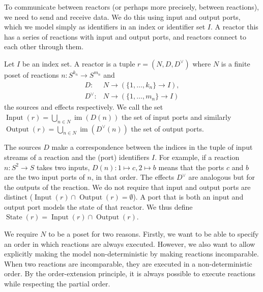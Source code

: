 To communicate between reactors (or perhaps more precisely, between reactions), we need to send and receive data.
We do this using input and output ports, which we model simply as identifiers in an index or identifier set $I$. 
A reactor this has a series of reactions with input and output ports, and reactors connect to each other through them.

\begin{defn}[Reactor]
\label{defn:reactor}
Let $I$ be an index set. A reactor is a tuple $r = (N,D,D^\vee)$  where $N$ is a finite \ac{poset} of reactions $n : S^{k_n} \rightarrow S^{m_n}$ and
 \begin{align*} D : & N \rightarrow (\{1, \ldots, k_n\} \rightarrow I), \\
     D^\vee : & N \rightarrow (\{1, \ldots, m_n\} \rightarrow I)
 \end{align*} the sources and effects respectively.
We call the set $\operatorname{Input}(r) = \bigcup_{ n \in N} \operatorname{im}(D(n))$ the set of input ports and 
similarly $\operatorname{Output}(r) = \bigcup_{ n \in N} \operatorname{im}(D^\vee(n))$ the set of output ports.
\end{defn}

The sources $D$ make a correspondence between the indices in the tuple of input streams of a reaction and the (port) identifiers $I$.
For example, if a reaction $n : S^2 \rightarrow S$ takes two inputs, $D(n) : 1 \mapsto c, 2 \mapsto b$ means that the ports $c$ and $b$ are the two input ports of $n$, in that order.
The effects $D^\vee$ are analogous but for the outputs of the reaction.
We do not require that input and output ports are distinct ($\operatorname{Input}(r) \cap \operatorname{Output}(r) = \emptyset$).
A port that is both an input and output port models the state of that reactor. 
We thus define $\operatorname{State}(r) = \operatorname{Input}(r) \cap \operatorname{Output}(r)$.

We require $N$ to be a \ac{poset} for two reasons.
Firstly, we want to be able to specify an order in which reactions are always executed.
However, we also want to allow explicitly making the model non-deterministic by making reactions incomparable. 
When two reactions are incomparable, they are executed in a non-deterministic order.
By the order-extension principle, it is always possible to execute reactions while respecting the partial order.

